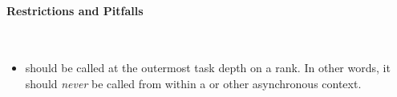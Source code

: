 \paragraph{Restrictions and Pitfalls}\mbox{} \\
\begin{itemize}
  \item {} should be called at the outermost task depth on
    a \gls{rank}.  In other words, it should {\it never} be called from within a
     or other asynchronous context.
\end{itemize}




